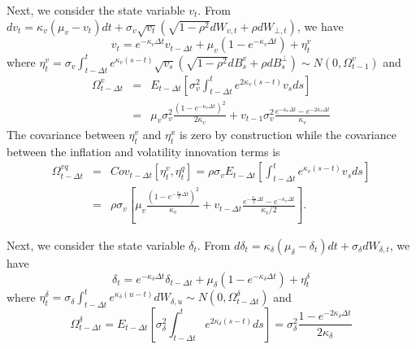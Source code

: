 \documentclass{article}
\begin{document}
Next, we consider the state variable $v_{t}$. From $dv_{t}=\kappa _{v}\left(
\mu _{v}-v_{t}\right) dt+\sigma _{v}\sqrt{v_{t}}\left( \sqrt{1-\rho ^{2}}%
dW_{v,t}+\rho dW_{\bot ,t}\right) $, we have%
\begin{equation*}
v_{t}=e^{-\kappa _{v}\Delta t}v_{t-\Delta t}+\mu _{v}\left( 1-e^{-\kappa
_{v}\Delta t}\right) +\eta _{t}^{v}
\end{equation*}%
where $\eta _{t}^{v}=\sigma _{v}\int_{t-\Delta t}^{t}e^{\kappa _{v}\left(
s-t\right) }\sqrt{v_{s}}\left( \sqrt{1-\rho ^{2}}dB_{s}^{v}+\rho
dB_{s}^{\bot }\right) \sim N\left( 0,\Omega _{t-1}^{v}\right) $ and%
\begin{eqnarray*}
\Omega _{t-\Delta t}^{v} &=&E_{t-\Delta t}\left[ \sigma
_{v}^{2}\int_{t-\Delta t}^{t}e^{2\kappa _{v}\left( s-t\right) }v_{s}ds\right]
\\
&=&\mu _{v}\sigma _{v}^{2}\frac{\left( 1-e^{-\kappa _{v}\Delta t}\right) ^{2}%
}{2\kappa _{v}}+v_{t-1}\sigma _{v}^{2}\frac{e^{-\kappa _{v}\Delta
t}-e^{-2\kappa _{v}\Delta t}}{\kappa _{v}}
\end{eqnarray*}%
The covariance between $\eta _{t}^{v}$ and $\eta _{t}^{x}$ is zero by
construction while the covariance between the inflation and volatility
innovation terms is%
\begin{eqnarray*}
\Omega _{t-\Delta t}^{vq} &=&Cov_{t-\Delta t}\left[ \eta _{t}^{v},\eta
_{t}^{q}\right] =\rho \sigma _{v}E_{t-\Delta t}\left[ \int_{t-\Delta
t}^{t}e^{\kappa _{v}\left( s-t\right) }v_{s}ds\right] \\
&=&\rho \sigma _{v}\left[ \mu _{v}\frac{\left( 1-e^{-\frac{\kappa _{v}}{2}%
\Delta t}\right) ^{2}}{\kappa _{v}}+v_{t-\Delta t}\frac{e^{-\frac{\kappa _{v}%
}{2}\Delta t}-e^{-\kappa _{v}\Delta t}}{\kappa _{v}/2}\right] .
\end{eqnarray*}

Next, we consider the state variable $\delta _{t}$. From $d\delta
_{t}=\kappa _{\delta }\left( \mu _{\delta }-\delta _{t}\right) dt+\sigma
_{\delta }dW_{\delta ,t}$, we have%
\begin{equation*}
\delta _{t}=e^{-\kappa _{\delta }\Delta t}\delta _{t-\Delta t}+\mu _{\delta
}\left( 1-e^{-\kappa _{\delta }\Delta t}\right) +\eta _{t}^{\delta }
\end{equation*}%
where $\eta _{t}^{\delta }=\sigma _{\delta }\int_{t-\Delta t}^{t}e^{\kappa
_{\delta }\left( u-t\right) }dW_{\delta ,u}\sim N\left( 0,\Omega _{t-\Delta
t}^{\delta }\right) $ and%
\begin{equation*}
\Omega _{t-\Delta t}^{\delta }=E_{t-\Delta t}\left[ \sigma _{\delta
}^{2}\int_{t-\Delta t}^{t}e^{2\kappa _{\delta }\left( s-t\right) }ds\right]
=\sigma _{\delta }^{2}\frac{1-e^{-2\kappa _{\delta }\Delta t}}{2\kappa
_{\delta }}
\end{equation*}
\end{document}
